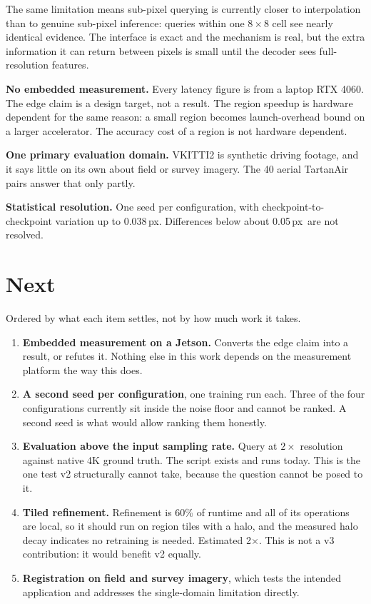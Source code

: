 \documentclass[11pt,a4paper]{article}
\newcommand{\px}{\,px}
\begin{document}
The same limitation means sub-pixel querying is currently closer to interpolation
than to genuine sub-pixel inference: queries within one $8\times8$ cell see nearly
identical evidence. The interface is exact and the mechanism is real, but the extra
information it can return between pixels is small until the decoder sees
full-resolution features.

\textbf{No embedded measurement.} Every latency figure is from a laptop RTX 4060. The
edge claim is a design target, not a result. The region speedup is hardware
dependent for the same reason: a small region becomes launch-overhead bound on a
larger accelerator. The accuracy cost of a region is not hardware dependent.

\textbf{One primary evaluation domain.} VKITTI2 is synthetic driving footage, and
it says little on its own about field or survey imagery. The 40 aerial TartanAir
pairs answer that only partly.

\textbf{Statistical resolution.} One seed per configuration, with
checkpoint-to-checkpoint variation up to 0.038\px. Differences below about
0.05\px\ are not resolved.

\section{Next}
\label{sec:next}
Ordered by what each item settles, not by how much work it takes.

\begin{enumerate}
\item \textbf{Embedded measurement on a Jetson.} Converts the edge claim into a
      result, or refutes it. Nothing else in this work depends on the measurement
      platform the way this does.
\item \textbf{A second seed per configuration}, one training run each. Three of
      the four configurations currently sit inside the noise floor and cannot be
      ranked. A second seed is what would allow ranking them honestly.
\item \textbf{Evaluation above the input sampling rate.} Query at $2\times$
      resolution against native 4K ground truth. The script exists and runs
      today. This is the one test v2 structurally cannot take, because the
      question cannot be posed to it.
\item \textbf{Tiled refinement.} Refinement is 60\% of runtime and all of its
      operations are local, so it should run on region tiles with a halo, and the
      measured halo decay indicates no retraining is needed. Estimated
      2$\times$. This is not a v3 contribution: it would benefit v2 equally.
\item \textbf{Registration on field and survey imagery}, which tests the intended
      application and addresses the single-domain limitation directly.
\end{enumerate}
\end{document}

